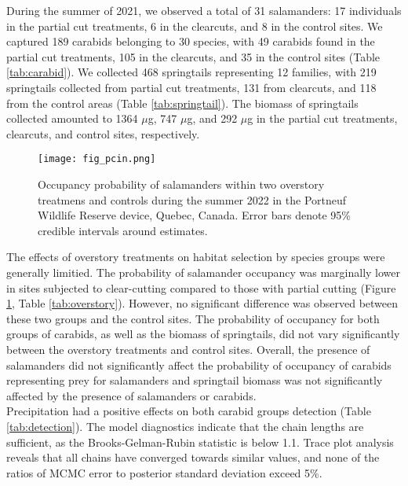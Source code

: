During the summer of 2021, we observed a total of 31 salamanders: 17 individuals in the partial cut treatments, 6 in the clearcuts, and 8 in the control sites. 
We captured 189 carabids belonging to 30 species, with 49 carabids found in the partial cut treatments, 105 in the clearcuts, and 35 in the control sites (Table \ref{tab:carabid}). 
We collected 468 springtails representing 12 families, with 219 springtails collected from partial cut treatments, 131 from clearcuts, and 118 from the control areas (Table \ref{tab:springtail}). 
The biomass of springtails collected amounted to 1364 $\mu$g, 747 $\mu$g, and 292 $\mu$g in the partial cut treatments, clearcuts, and control sites, respectively.

\begin{figure}[ht]
  \centering
  \texttt{[image: fig\_pcin.png]}
  \caption[Occupancy probability of salamanders under overstory treatments]
  {Occupancy probability of salamanders within two overstory treatmens and controls during the summer 2022 in the Portneuf Wildlife Reserve device, Quebec, Canada. 
  Error bars denote 95\% credible intervals around estimates.}
  \label{fig:pcin}
\end{figure}

\vspace{0.5cm}

The effects of overstory treatments on habitat selection by species groups were generally limitied.
The probability of salamander occupancy was marginally lower in sites subjected to clear-cutting compared to those with partial cutting (Figure \ref{fig:pcin}, Table \ref{tab:overstory}). However, no significant difference was observed between these two groups and the control sites. 
The probability of occupancy for both groups of carabids, as well as the biomass of springtails, did not vary significantly between the overstory treatments and control sites. 
Overall, the presence of salamanders did not significantly affect the probability of occupancy of carabids representing prey for salamanders and springtail biomass was not significantly affected by the presence of salamanders or carabids. \\
Precipitation had a positive effects on both carabid groups detection (Table \ref{tab:detection}). 
The model diagnostics indicate that the chain lengths are sufficient, as the Brooks-Gelman-Rubin statistic is below 1.1.
Trace plot analysis reveals that all chains have converged towards similar values, and none of the ratios of MCMC error to posterior standard deviation exceed 5\%.

